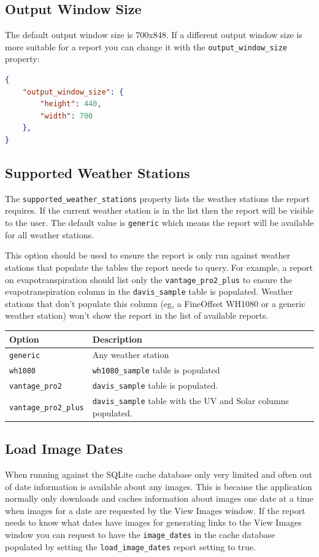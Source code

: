\documentclass[a4paper,10pt]{book}
\begin{document}
\subsection{Output Window Size}
The default output window size is 700x848. If a different output window size is more suitable for a report you can change it with the \verb|output_window_size| property:

\begin{lstlisting}[language=json]
{
    "output_window_size": {
        "height": 440,
        "width": 700
    },
}
\end{lstlisting}

\subsection{Supported Weather Stations}
The \verb|supported_weather_stations| property lists the weather stations the report requires. If the current weather station is in the list then the report will be visible to the user. The default value is \verb|generic| which means the report will be available for all weather stations.

This option should be used to ensure the report is only run against weather stations that populate the tables the report needs to query. For example, a report on evapotranspiration should list only the \verb|vantage_pro2_plus| to ensure the evapotranspiration column in the \verb|davis_sample| table is populated. Weather stations that don't populate this column (eg, a FineOffset WH1080 or a generic weather station) won't show the report in the list of available reports.

\begin{tabular}{p{3.3cm} l}
\hline
\textbf{Option} & \textbf{Description} \\
\hline
\verb|generic| & Any weather station \\
\verb|wh1080| & \verb|wh1080_sample| table is populated\\
\verb|vantage_pro2| & \verb|davis_sample| table is populated.\\
\verb|vantage_pro2_plus| & \verb|davis_sample| table with the UV and Solar columns populated.\\
\hline
\end{tabular}

\subsection{Load Image Dates}
When running against the SQLite cache database only very limited and often out of date information is available about any images. This is because the application normally only downloads and caches information about images one date at a time when images for a date are requested by the View Images window. If the report needs to know what dates have images for generating links to the View Images window you can request to have the \verb|image_dates| in the cache database populated by setting the \verb|load_image_dates| report setting to true.
\end{document}
